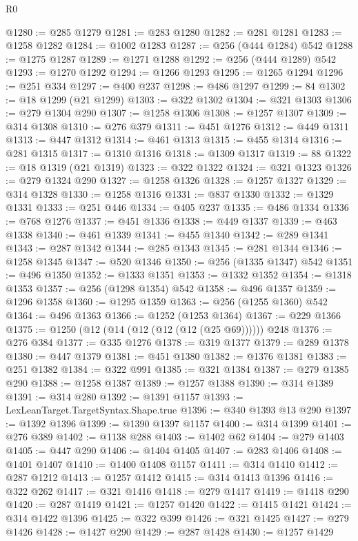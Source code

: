 \begin{lexlean}{R0}
\begin{coremodule}
@1280 := @285 @1279
@1281 := @283 @1280
@1282 := @281 @1281
@1283 := @1258 @1282
@1284 := @1002 @1283
@1287 := @256 (@444 @1284) @542
@1288 := @1275 @1287
@1289 := @1271 @1288
@1292 := @256 (@444 @1289) @542
@1293 := @1270 @1292
@1294 := @1266 @1293
@1295 := @1265 @1294
@1296 := @251 @334
@1297 := @400 @237
@1298 := @486 @1297
@1299 := 84
@1302 := @18 @1299 (@21 @1299)
@1303 := @322 @1302
@1304 := @321 @1303
@1306 := @279 @1304 @290
@1307 := @1258 @1306
@1308 := @1257 @1307
@1309 := @314 @1308
@1310 := @276 @379
@1311 := @451 @1276
@1312 := @449 @1311
@1313 := @447 @1312
@1314 := @461 @1313
@1315 := @455 @1314
@1316 := @281 @1315
@1317 := @1310 @1316
@1318 := @1309 @1317
@1319 := 88
@1322 := @18 @1319 (@21 @1319)
@1323 := @322 @1322
@1324 := @321 @1323
@1326 := @279 @1324 @290
@1327 := @1258 @1326
@1328 := @1257 @1327
@1329 := @314 @1328
@1330 := @1258 @1316
@1331 := @837 @1330
@1332 := @1329 @1331
@1333 := @251 @446
@1334 := @405 @237
@1335 := @486 @1334
@1336 := @768 @1276
@1337 := @451 @1336
@1338 := @449 @1337
@1339 := @463 @1338
@1340 := @461 @1339
@1341 := @455 @1340
@1342 := @289 @1341
@1343 := @287 @1342
@1344 := @285 @1343
@1345 := @281 @1344
@1346 := @1258 @1345
@1347 := @520 @1346
@1350 := @256 (@1335 @1347) @542
@1351 := @496 @1350
@1352 := @1333 @1351
@1353 := @1332 @1352
@1354 := @1318 @1353
@1357 := @256 (@1298 @1354) @542
@1358 := @496 @1357
@1359 := @1296 @1358
@1360 := @1295 @1359
@1363 := @256 (@1255 @1360) @542
@1364 := @496 @1363
@1366 := @1252 (@1253 @1364)
@1367 := @229 @1366
@1375 := @1250 (@12 (@14 (@12 (@12 (@12 (@25 @69)))))) @248
@1376 := @276 @384
@1377 := @335 @1276
@1378 := @319 @1377
@1379 := @289 @1378
@1380 := @447 @1379
@1381 := @451 @1380
@1382 := @1376 @1381
@1383 := @251 @1382
@1384 := @322 @991
@1385 := @321 @1384
@1387 := @279 @1385 @290
@1388 := @1258 @1387
@1389 := @1257 @1388
@1390 := @314 @1389
@1391 := @314 @280
@1392 := @1391 @1157
@1393 := LexLeanTarget.TargetSyntax.Shape.true
@1396 := @340 @1393 @13 @290
@1397 := @1392 @1396
@1399 := @1390 @1397 @1157
@1400 := @314 @1399
@1401 := @276 @389
@1402 := @1138 @288
@1403 := @1402 @62
@1404 := @279 @1403
@1405 := @447 @290
@1406 := @1404 @1405
@1407 := @283 @1406
@1408 := @1401 @1407
@1410 := @1400 @1408 @1157
@1411 := @314 @1410
@1412 := @287 @1212
@1413 := @1257 @1412
@1415 := @314 @1413 @1396
@1416 := @322 @262
@1417 := @321 @1416
@1418 := @279 @1417
@1419 := @1418 @290
@1420 := @287 @1419
@1421 := @1257 @1420
@1422 := @1415 @1421
@1424 := @314 @1422 @1396
@1425 := @322 @399
@1426 := @321 @1425
@1427 := @279 @1426
@1428 := @1427 @290
@1429 := @287 @1428
@1430 := @1257 @1429

\end{coremodule}
\end{lexlean}
